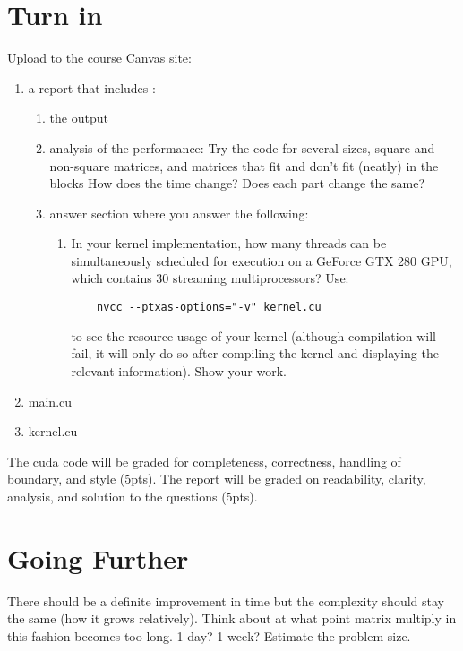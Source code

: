 \documentclass{article}
\begin{document}
\section{Turn in}
Upload to the course Canvas site:
\begin{enumerate}
\item a report that includes :
	\begin{enumerate}
	\item the output
	\item analysis of the performance: Try the code for several sizes, square and non-square matrices, and matrices that fit and don't fit (neatly) in the blocks  How does the time change?  Does each part change the same?
	\item answer section where you answer the following:
		\begin{enumerate}
		\item In your kernel implementation, how many threads can be simultaneously scheduled for execution on a GeForce GTX 280 GPU, which contains 30 streaming multiprocessors? Use:
\begin{verbatim}
	nvcc --ptxas-options="-v" kernel.cu
\end{verbatim}
to see the resource usage of your kernel (although compilation will fail, it will only do so after compiling the kernel and displaying the relevant information). Show your work.
		\end{enumerate}
	\end{enumerate}
\item main.cu
\item kernel.cu
\end{enumerate}
The cuda code will be graded for completeness, correctness, handling of boundary, and style (5pts).  The report will be graded on readability, clarity, analysis, and solution to the questions (5pts).


\section{Going Further}
There should be a definite improvement in time but the complexity should stay the same (how it grows relatively).  Think about at what point matrix multiply in this fashion becomes too long.  1 day? 1 week?  Estimate the problem size.
\end{document}
